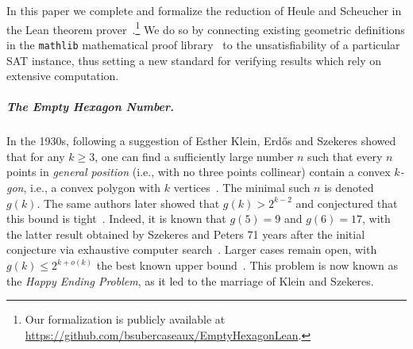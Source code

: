 
In this paper we complete and formalize the reduction of Heule and Scheucher in the Lean theorem prover~\cite{demouraLeanTheoremProver2015}.\footnote{Our formalization is publicly available at \url{https://github.com/bsubercaseaux/EmptyHexagonLean}.}
We do so by connecting existing geometric definitions
in the \texttt{mathlib} mathematical proof library~\cite{The_mathlib_Community_2020}
to the unsatisfiability of a particular SAT instance, thus setting a new standard for verifying results which rely on extensive computation.

\subparagraph*{The Empty Hexagon Number.}
In the 1930s,
following a suggestion of Esther Klein,
Erd\H{o}s and Szekeres showed that for any $k \geq 3$,
one can find a sufficiently large number $n$
such that every $n$ points in \emph{general position}
(i.e., with no three points collinear)
contain a convex \emph{$k$-gon}, i.e., a convex polygon with $k$ vertices~\cite{35erdos_combinatorial_problem_geometry}.
The minimal such $n$ is denoted $g(k)$.
The same authors later showed that $g(k) > 2^{k-2}$
and conjectured that this bound is tight~\cite{60erdos_some_extremum_problems_elementary_geometry}.
Indeed, it is known that $g(5) = 9$ and $g(6) = 17$,
with the latter result obtained by Szekeres and Peters 71 years after the initial conjecture
via exhaustive computer search~\cite{06szekeres_computer_solution_17_point_erdos_szekeres_problem}.
Larger cases remain open,
with $g(k) \leq 2^{k+o(k)}$ the best known upper bound~\cite{suk2017erdos,holmsen2017two}.
This problem is now known as the \emph{Happy Ending Problem},
as it led to the marriage of Klein and Szekeres.

